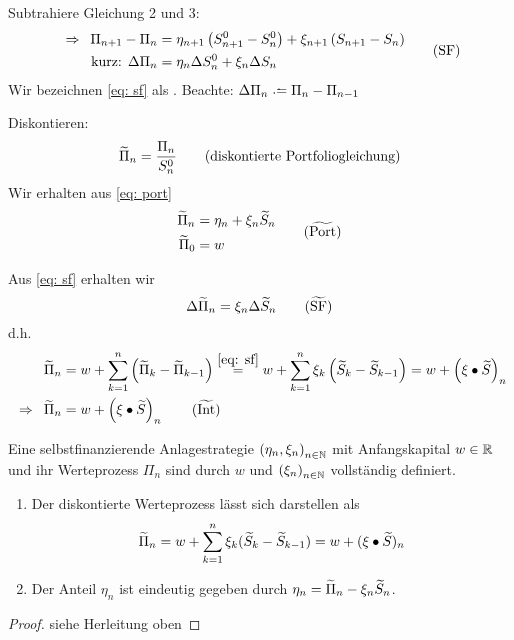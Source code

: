 Subtrahiere Gleichung 2 und 3: 
\begin{equation}
	\begin{aligned}
		\enskip \Rightarrow \enskip \Pi_{n+1} - \Pi_n &= \eta_{n+1} \left( S_{n+1}^0 - S_n^0 \right) + \xi_{n+1} \left( S_{n+1} - S_n \right) \\
		\text{kurz: } \Delta \Pi_n &= \eta_n \Delta S_n^0 + \xi_n \Delta S_n
	\end{aligned}
	\tag{SF} \label{eq: sf}
\end{equation}
Wir bezeichnen \eqref{eq: sf} als . Beachte: $\Delta \Pi_n \defeq \Pi_n - \Pi_{n-1}$

Diskontieren:
\begin{equation}
	\widetilde{\Pi}_n = \frac{\Pi_n}{S_n^0} 
	\tag{diskontierte Portfoliogleichung}
\end{equation}
Wir erhalten aus \eqref{eq: port}
\begin{equation}
	\begin{aligned}
	\schlange{\Pi}_n &= \eta_n + \xi_n \schlange{S}_n \\
	\schlange{\Pi}_0 &= w
	\end{aligned}
	\tag{$\schlange{\text{Port}}$}
\end{equation}

Aus \eqref{eq: sf} erhalten wir
\begin{equation}
	\Delta \schlange{\Pi}_n = \xi_n \Delta \schlange{S}_n
	\tag{$\schlange{\text{SF}}$} \label{eq: sf-schlange}
\end{equation}
d.h.
\begin{align}
		\schlange{\Pi}_n  &= w + \sum_{k=1}^n \brackets{\schlange\Pi_k - \schlange\Pi_{k-1} }
		\overset{\eqref{eq: sf}}{=} w + \sum_{k=1}^n \xi_k \brackets{\schlange S_k - \schlange S_{k-1}} 
		= w + \brackets{\xi \bullet \schlange{S}}_n \nonumber \\
		\follows \schlange\Pi_n &= w + \brackets{\xi \bullet \schlange{S}}_n
		\tag{$\schlange{\text{Int}}$}
\end{align}


\begin{lemma} %
	Eine selbstfinanzierende Anlagestrategie $\left( \eta_n, \xi_n \right)_{n \in \mathbb{N}}$ mit Anfangskapital $w \in \mathbb{R}$ und ihr Werteprozess $\Pi_n$ sind durch $w$ und $\left( \xi_n \right)_{n \in \mathbb{N}}$ vollständig definiert. 
	\begin{enumerate}[label=(\alph*), leftmargin=*, nolistsep, topsep=-\parskip]
		\item Der diskontierte Werteprozess lässt sich darstellen als
		\begin{equation*}
		\widetilde{\Pi}_n = w + \sum_{k=1}^n \xi_k (\widetilde{S}_k - \widetilde{S}_{k-1}) = w + (\xi \bullet \widetilde{S})_n
		\end{equation*}
		\item Der Anteil $\eta_n$ ist eindeutig gegeben durch $\eta_n = \widetilde{\Pi}_n - \xi_n \widetilde{S}_n$.
	\end{enumerate}
\end{lemma}
\begin{proof}
	siehe Herleitung oben
\end{proof}
